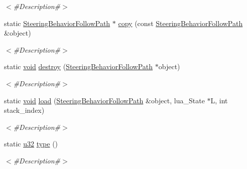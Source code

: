 \begin{DoxyCompactItemize}
\begin{DoxyCompactList}\small\item\em $<$\#\+Description\#$>$ \end{DoxyCompactList}\item 
static \mbox{\hyperlink{classnjli_1_1_steering_behavior_follow_path}{Steering\+Behavior\+Follow\+Path}} $\ast$ \mbox{\hyperlink{classnjli_1_1_steering_behavior_follow_path_a7043e83acc2cb2c60764482381b6fc80}{copy}} (const \mbox{\hyperlink{classnjli_1_1_steering_behavior_follow_path}{Steering\+Behavior\+Follow\+Path}} \&object)
\begin{DoxyCompactList}\small\item\em $<$\#\+Description\#$>$ \end{DoxyCompactList}\item 
static \mbox{\hyperlink{_thread_8h_af1e856da2e658414cb2456cb6f7ebc66}{void}} \mbox{\hyperlink{classnjli_1_1_steering_behavior_follow_path_a7f300e1c19fe1dca40bd27d539dcc694}{destroy}} (\mbox{\hyperlink{classnjli_1_1_steering_behavior_follow_path}{Steering\+Behavior\+Follow\+Path}} $\ast$object)
\begin{DoxyCompactList}\small\item\em $<$\#\+Description\#$>$ \end{DoxyCompactList}\item 
static \mbox{\hyperlink{_thread_8h_af1e856da2e658414cb2456cb6f7ebc66}{void}} \mbox{\hyperlink{classnjli_1_1_steering_behavior_follow_path_a8c7efeb2a9c8e8793693c30ef7d299c2}{load}} (\mbox{\hyperlink{classnjli_1_1_steering_behavior_follow_path}{Steering\+Behavior\+Follow\+Path}} \&object, lua\+\_\+\+State $\ast$L, int stack\+\_\+index)
\begin{DoxyCompactList}\small\item\em $<$\#\+Description\#$>$ \end{DoxyCompactList}\item 
static \mbox{\hyperlink{_util_8h_a10e94b422ef0c20dcdec20d31a1f5049}{u32}} \mbox{\hyperlink{classnjli_1_1_steering_behavior_follow_path_add1071a0484694e2bde97970647036b4}{type}} ()
\begin{DoxyCompactList}\small\item\em $<$\#\+Description\#$>$ \end{DoxyCompactList}\end{DoxyCompactItemize}
